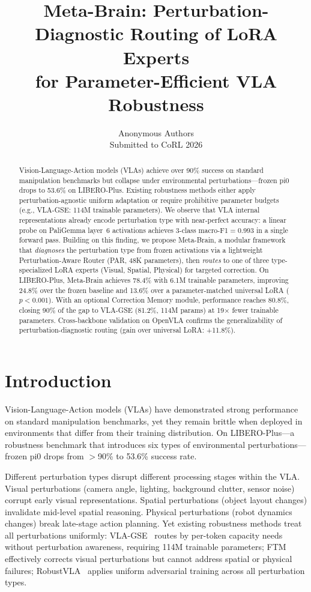 \documentclass[conference]{article}
\title{Meta-Brain: Perturbation-Diagnostic Routing of LoRA Experts\\for Parameter-Efficient VLA Robustness}
\author{
  Anonymous Authors\\
  Submitted to CoRL 2026
}
\date{}
\newcommand{\ours}{Meta-Brain}
\newcommand{\liberoplus}{LIBERO-Plus}
\begin{document}
\maketitle

\begin{abstract}
Vision-Language-Action models (VLAs) achieve over 90\% success on standard manipulation benchmarks but collapse under environmental perturbations---frozen pi0 drops to 53.6\% on \liberoplus{}.
Existing robustness methods either apply perturbation-agnostic uniform adaptation or require prohibitive parameter budgets (e.g., VLA-GSE: 114M trainable parameters).
We observe that VLA internal representations already encode perturbation type with near-perfect accuracy: a linear probe on PaliGemma layer~6 activations achieves 3-class macro-F1$=$0.993 in a single forward pass.
Building on this finding, we propose \ours{}, a modular framework that \emph{diagnoses} the perturbation type from frozen activations via a lightweight Perturbation-Aware Router (PAR, 48K parameters), then \emph{routes} to one of three type-specialized LoRA experts (Visual, Spatial, Physical) for targeted correction.
On \liberoplus{}, \ours{} achieves 78.4\% with 6.1M trainable parameters, improving 24.8\% over the frozen baseline and 13.6\% over a parameter-matched universal LoRA ($p<0.001$).
With an optional Correction Memory module, performance reaches 80.8\%, closing 90\% of the gap to VLA-GSE (81.2\%, 114M params) at 19$\times$ fewer trainable parameters.
Cross-backbone validation on OpenVLA confirms the generalizability of perturbation-diagnostic routing (gain over universal LoRA: +11.8\%).
\end{abstract}

\section{Introduction}

Vision-Language-Action models (VLAs) have demonstrated strong performance on standard manipulation benchmarks, yet they remain brittle when deployed in environments that differ from their training distribution.
On \liberoplus{}---a robustness benchmark that introduces six types of environmental perturbations---frozen pi0 drops from $>$90\% to 53.6\% success rate.

Different perturbation types disrupt different processing stages within the VLA.
Visual perturbations (camera angle, lighting, background clutter, sensor noise) corrupt early visual representations.
Spatial perturbations (object layout changes) invalidate mid-level spatial reasoning.
Physical perturbations (robot dynamics changes) break late-stage action planning.
Yet existing robustness methods treat all perturbations uniformly: VLA-GSE~\cite{vla-gse} routes by per-token capacity needs without perturbation awareness, requiring 114M trainable parameters; FTM~\cite{ftm} effectively corrects visual perturbations but cannot address spatial or physical failures; RobustVLA~\cite{robustvla} applies uniform adversarial training across all perturbation types.
\end{document}
